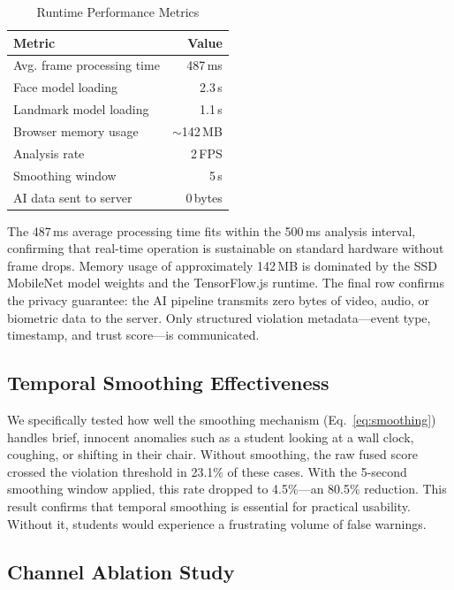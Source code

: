 \documentclass[conference]{IEEEtran}
\begin{document}
\begin{table}[htbp]
\caption{Runtime Performance Metrics}
\label{tab:performance}
\centering
\renewcommand{\arraystretch}{1.15}
\begin{tabular}{@{}lr@{}}
\toprule
\textbf{Metric} & \textbf{Value} \\
\midrule
Avg. frame processing time   & 487\,ms \\
Face model loading           & 2.3\,s \\
Landmark model loading       & 1.1\,s \\
Browser memory usage         & $\sim$142\,MB \\
Analysis rate                & 2\,FPS \\
Smoothing window             & 5\,s \\
AI data sent to server       & 0\,bytes \\
\bottomrule
\end{tabular}
\end{table}

The 487\,ms average processing time fits within the 500\,ms analysis interval, confirming that real-time operation is sustainable on standard hardware without frame drops. Memory usage of approximately 142\,MB is dominated by the SSD MobileNet model weights and the TensorFlow.js runtime. The final row confirms the privacy guarantee: the AI pipeline transmits zero bytes of video, audio, or biometric data to the server. Only structured violation metadata---event type, timestamp, and trust score---is communicated.

\subsection{Temporal Smoothing Effectiveness}

We specifically tested how well the smoothing mechanism (Eq.~\ref{eq:smoothing}) handles brief, innocent anomalies such as a student looking at a wall clock, coughing, or shifting in their chair. Without smoothing, the raw fused score crossed the violation threshold in 23.1\% of these cases. With the 5-second smoothing window applied, this rate dropped to 4.5\%---an 80.5\% reduction. This result confirms that temporal smoothing is essential for practical usability. Without it, students would experience a frustrating volume of false warnings.

\subsection{Channel Ablation Study}
\end{document}
